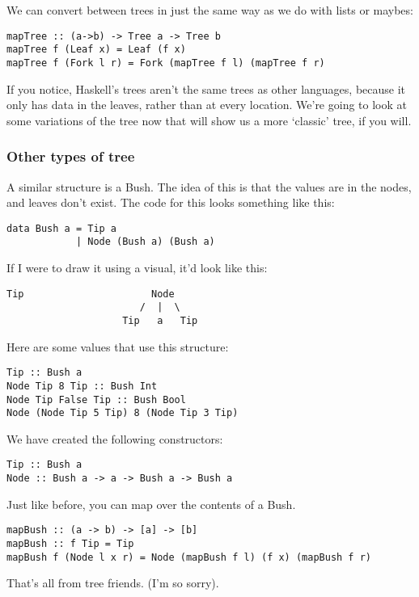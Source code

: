 \documentclass[11pt,a4paper,titlepage,dvipsnames,cmyk]{scrartcl}
\begin{document}
We can convert between trees in just the same way as we do with lists or
maybes:

\begin{lstlisting}[style=B]
mapTree :: (a->b) -> Tree a -> Tree b
mapTree f (Leaf x) = Leaf (f x)
mapTree f (Fork l r) = Fork (mapTree f l) (mapTree f r)
\end{lstlisting}

If you notice, Haskell's trees aren't the same trees as other languages,
because it only has data in the leaves, rather than at every location.
We're going to look at some variations of the tree now that will show us a
more `classic' tree, if you will.

\subsubsection{Other types of tree}%
\label{ssub:trees1}
A similar structure is a Bush. The idea of this is that the values are in
the nodes, and leaves don't exist. The code for this looks something like
this:
\begin{lstlisting}[style=B]
data Bush a = Tip a
            | Node (Bush a) (Bush a)
\end{lstlisting}

If I were to draw it using a visual, it'd look like this:
\begin{lstlisting}[style=B]
Tip                      Node
                       /  |  \
                    Tip   a   Tip
\end{lstlisting}

Here are some values that use this structure:
\begin{lstlisting}[style=B]
Tip :: Bush a
Node Tip 8 Tip :: Bush Int
Node Tip False Tip :: Bush Bool
Node (Node Tip 5 Tip) 8 (Node Tip 3 Tip)
\end{lstlisting}

We have created the following constructors:
\begin{lstlisting}[style=B]
Tip :: Bush a
Node :: Bush a -> a -> Bush a -> Bush a
\end{lstlisting}

Just like before, you can map over the contents of a Bush.

\begin{lstlisting}[style=B]
mapBush :: (a -> b) -> [a] -> [b]
mapBush :: f Tip = Tip
mapBush f (Node l x r) = Node (mapBush f l) (f x) (mapBush f r)
\end{lstlisting}

That's all from tree friends. (I'm so sorry).
\end{document}
